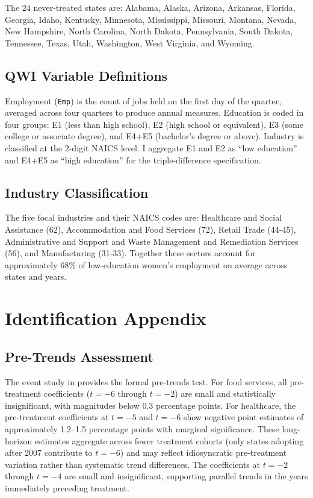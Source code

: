 \documentclass[12pt]{article}
\begin{document}
The 24 never-treated states are: Alabama, Alaska, Arizona, Arkansas, Florida, Georgia, Idaho, Kentucky, Minnesota, Mississippi, Missouri, Montana, Nevada, New Hampshire, North Carolina, North Dakota, Pennsylvania, South Dakota, Tennessee, Texas, Utah, Washington, West Virginia, and Wyoming.

\subsection{QWI Variable Definitions}

Employment (\texttt{Emp}) is the count of jobs held on the first day of the quarter, averaged across four quarters to produce annual measures. Education is coded in four groups: E1 (less than high school), E2 (high school or equivalent), E3 (some college or associate degree), and E4+E5 (bachelor's degree or above). Industry is classified at the 2-digit NAICS level. I aggregate E1 and E2 as ``low education'' and E4+E5 as ``high education'' for the triple-difference specification.

\subsection{Industry Classification}

The five focal industries and their NAICS codes are: Healthcare and Social Assistance (62), Accommodation and Food Services (72), Retail Trade (44-45), Administrative and Support and Waste Management and Remediation Services (56), and Manufacturing (31-33). Together these sectors account for approximately 68\% of low-education women's employment on average across states and years.


\section{Identification Appendix}
\label{app:identification}

\subsection{Pre-Trends Assessment}

The event study in  provides the formal pre-trends test. For food services, all pre-treatment coefficients ($t = -6$ through $t = -2$) are small and statistically insignificant, with magnitudes below 0.3 percentage points. For healthcare, the pre-treatment coefficients at $t = -5$ and $t = -6$ show negative point estimates of approximately 1.2--1.5 percentage points with marginal significance. These long-horizon estimates aggregate across fewer treatment cohorts (only states adopting after 2007 contribute to $t = -6$) and may reflect idiosyncratic pre-treatment variation rather than systematic trend differences. The coefficients at $t = -2$ through $t = -4$ are small and insignificant, supporting parallel trends in the years immediately preceding treatment.
\end{document}
